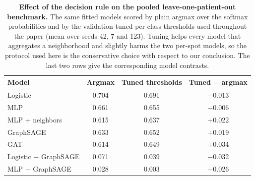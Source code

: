 \documentclass[11pt,letterpaper]{article}
\begin{document}
\begin{table}[H]
\centering
\caption{\textbf{Effect of the decision rule on the pooled leave-one-patient-out benchmark.} The same fitted models scored by plain argmax over the softmax probabilities and by the validation-tuned per-class thresholds used throughout the paper (mean over seeds 42, 7 and 123). Tuning helps every model that aggregates a neighborhood and slightly harms the two per-spot models, so the protocol used here is the conservative choice with respect to our conclusion. The last two rows give the corresponding model contrasts.}
\label{tab:s13}
\small
\begin{tabular}{lccc}
\toprule
\textbf{Model} & \textbf{Argmax} & \textbf{Tuned thresholds} & \textbf{Tuned $-$ argmax} \\
\midrule
Logistic & 0.704 & 0.691 & $-$0.013 \\
MLP & 0.661 & 0.655 & $-$0.006 \\
MLP + neighbors & 0.615 & 0.637 & +0.022 \\
GraphSAGE & 0.633 & 0.652 & +0.019 \\
GAT & 0.614 & 0.649 & +0.034 \\
\midrule
Logistic $-$ GraphSAGE & 0.071 & 0.039 & $-$0.032 \\
MLP $-$ GraphSAGE & 0.028 & 0.003 & $-$0.026 \\
\bottomrule
\end{tabular}
\end{table}
\end{document}
